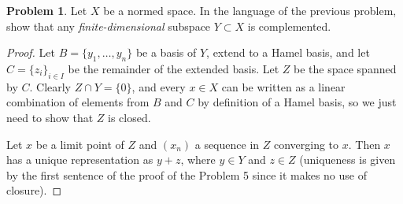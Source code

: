 \documentclass[12pt]{article}
\theoremstyle{definition}
\newtheorem{ex}{Problem}
\begin{document}
\begin{ex}
  Let $X$ be a normed space.
  In the language of the previous problem, show that any \textit{finite-dimensional} subspace $Y \subset X$ is complemented.
\end{ex}
\begin{proof}
    Let $B = \lbrace y_1, \dots, y_n \rbrace$ be a basis of $Y$, extend to a Hamel basis, and let $C = \lbrace z_i \rbrace_{i \in I}$ be the remainder of the extended basis.
    Let $Z$ be the space spanned by $C$.
    Clearly $Z \cap Y = \lbrace 0 \rbrace$, and every $x \in X$ can be written as a linear combination of elements from $B$ and $C$ by definition of a Hamel basis, so we just need to show that $Z$ is closed.

    Let $x$ be a limit point of $Z$ and $(x_n)$ a sequence in $Z$ converging to $x$.
    Then $x$ has a unique representation as $y + z$, where $y \in Y$ and $z \in Z$ (uniqueness is given by the first sentence of the proof of the Problem 5 since it makes no use of closure).
    
\end{proof}
\end{document}

